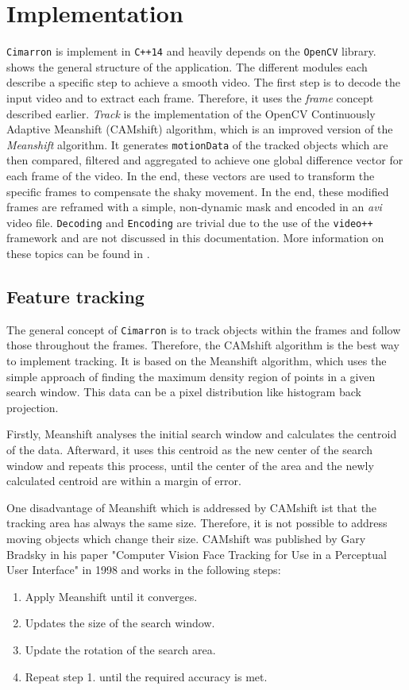 \section{Implementation}
\texttt{Cimarron} is implement in \texttt{C++14} and heavily depends on the \texttt{OpenCV} library.  shows the general structure of the application. The different modules each describe a specific step to achieve a smooth video. The first step is to decode the input video and to extract each frame. Therefore, it uses the \textit{frame} concept described earlier. \textit{Track} is the implementation of the OpenCV Continuously Adaptive Meanshift (CAMshift) algorithm, which is an improved version of the \textit{Meanshift} algorithm. It generates \texttt{motionData} of the tracked objects which are then compared, filtered and aggregated to achieve one global difference vector for each frame of the video. In the end, these vectors are used to transform the specific frames to compensate the shaky movement. In the end, these modified frames are reframed with a simple, non-dynamic mask and encoded in an \textit{avi} video file.
\texttt{Decoding} and \texttt{Encoding} are trivial due to the use of the \texttt{video++} framework and are not discussed in this documentation. More information on these topics can be found in \cite{7115639,matt42vp0:online}.

\subsection{Feature tracking}
The general concept of \texttt{Cimarron} is to track objects within the frames and follow those throughout the frames. Therefore, the CAMshift algorithm is the best way to implement tracking. It is based on the Meanshift algorithm, which uses the simple approach of finding the maximum density region of points in a given search window. This data can be a pixel distribution like histogram back projection.

Firstly, Meanshift analyses the initial search window and calculates the centroid of the data. Afterward, it uses this centroid as the new center of the search window and repeats this process, until the center of the area and the newly calculated centroid are within a margin of error.

One disadvantage of Meanshift which is addressed by CAMshift ist that the tracking area has always the same size. Therefore, it is not possible to address moving objects which change their size. CAMshift was published by Gary Bradsky in his paper "Computer Vision Face Tracking for Use in a Perceptual User Interface" in 1998 and works in the following steps:
\begin{enumerate}
    \item Apply Meanshift until it converges.
    \item Updates the size of the search window.
    \item Update the rotation of the search area.
    \item Repeat step 1. until the required accuracy is met.
\end{enumerate}

